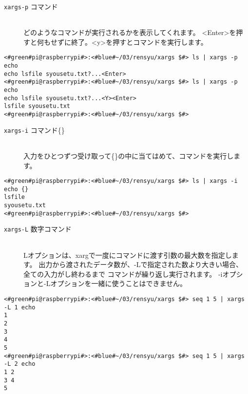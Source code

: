 \begin{description}
    \item[\texttt{xargs}\textvisiblespace \texttt{-p}\textvisiblespace
                コマンド]\mbox{}\\
    どのようなコマンドが実行されるかを表示してくれます。
    <Enter>を押すと何もせずに終了。<y>を押すとコマンドを実行します。
\end{description}

\begin{lstlisting}[caption=xargsコマンドのオプションp]
<#green#pi@raspberrypi#>:<#blue#~/03/rensyu/xargs $#> ls | xargs -p echo
echo lsfile syousetu.txt?...<Enter>
<#green#pi@raspberrypi#>:<#blue#~/03/rensyu/xargs $#> ls | xargs -p echo
echo lsfile syousetu.txt?...<Y><Enter>
lsfile syousetu.txt
<#green#pi@raspberrypi#>:<#blue#~/03/rensyu/xargs $#>
\end{lstlisting}

\begin{description}
    \item[\texttt{xargs}\textvisiblespace \texttt{-i}\textvisiblespace
                コマンド\textvisiblespace \{\}]\mbox{}\\
    入力をひとつずつ受け取って\{\}の中に当てはめて、コマンドを実行します。
\end{description}

\begin{lstlisting}[caption=xargsコマンドのオプションi]
<#green#pi@raspberrypi#>:<#blue#~/03/rensyu/xargs $#> ls | xargs -i echo {}
lsfile
syousetu.txt
<#green#pi@raspberrypi#>:<#blue#~/03/rensyu/xargs $#>
\end{lstlisting}

\begin{description}
    \item[\texttt{xargs}\textvisiblespace \texttt{-L}\textvisiblespace
                数字\textvisiblespace コマンド]\mbox{}\\
    Lオプションは、xargで一度にコマンドに渡す引数の最大数を指定します。
    出力から渡されたデータ数が、-Lで指定された数より大きい場合、全ての入力がし終わるまで
    コマンドが繰り返し実行されます。
    -iオプションと-Lオプションを一緒に使うことはできません。
\end{description}

\begin{lstlisting}[caption=xargsコマンドのオプションL]
<#green#pi@raspberrypi#>:<#blue#~/03/rensyu/xargs $#> seq 1 5 | xargs -L 1 echo
1
2
3
4
5
<#green#pi@raspberrypi#>:<#blue#~/03/rensyu/xargs $#> seq 1 5 | xargs -L 2 echo
1 2
3 4
5
\end{lstlisting}

